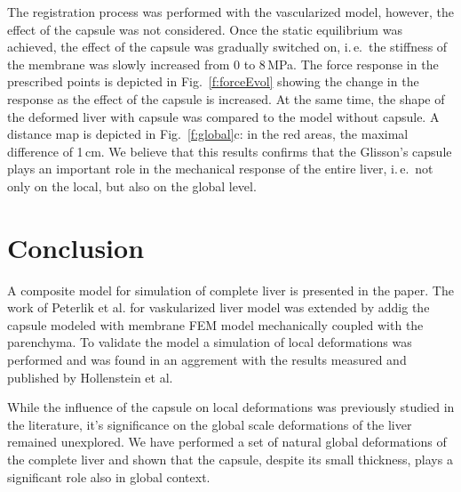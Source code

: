 \documentclass{llncs}
\def\ie{i.\,e.}
\begin{document}
The registration process was performed with the vascularized model, however, the effect of the capsule was 
not considered. Once the static equilibrium was achieved, the effect of the capsule was gradually switched 
on, \ie\ the stiffness of the membrane was slowly increased from 0 to 8\,MPa. The force response in the 
prescribed points is depicted in Fig.~\ref{f:forceEvol} showing the change in the response as the effect
of the capsule is increased. At the same time, the shape of the deformed liver with capsule was compared 
to the model without capsule. A distance map is depicted in Fig.~\ref{f:global}c: in the red areas, the 
maximal difference of 1\,cm. We believe that this results confirms that the Glisson's capsule 
plays an important role in the mechanical response of the entire liver, \ie\ not only on the local, but 
also on the global level.


\section{Conclusion} %

A composite model for simulation of complete liver is presented in the
paper. The work of Peterlik et al. for vaskularized liver model was
extended by addig the capsule modeled with membrane FEM model mechanically
coupled with the parenchyma. To validate the model a simulation of local
deformations was performed and was found in an aggrement with the results
measured and published by Hollenstein et al.

While the influence of the capsule on local deformations was previously
studied in the literature, it's significance on the global scale
deformations of the liver remained unexplored. We have performed a set of
natural global deformations of the complete liver and shown that the
capsule, despite its small thickness, plays a significant role also in
global context.


%
%



\end{document}
